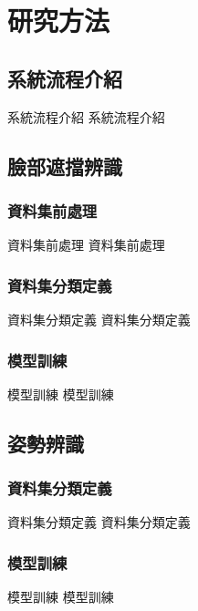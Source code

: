 \documentclass[class=NCU_thesis, crop=false]{standalone}
\begin{document}
\chapter{研究方法}

\section{系統流程介紹}
系統流程介紹 系統流程介紹

\section{臉部遮擋辨識}
\subsection{資料集前處理}
資料集前處理 資料集前處理

\subsection{資料集分類定義}
資料集分類定義 資料集分類定義

\subsection{模型訓練}
模型訓練 模型訓練

\section{姿勢辨識}
\subsection{資料集分類定義}
資料集分類定義 資料集分類定義

\subsection{模型訓練}
模型訓練 模型訓練
\end{document}

